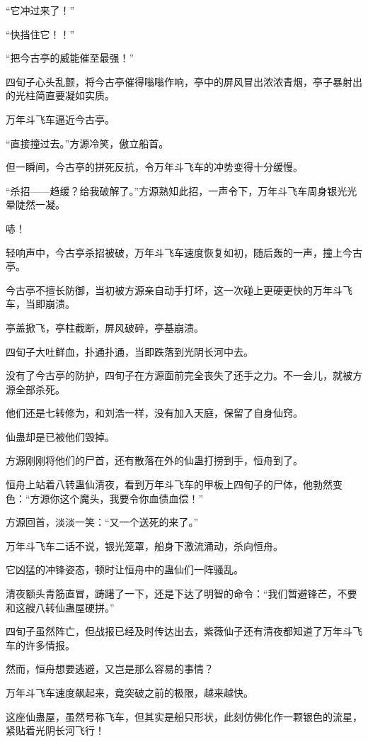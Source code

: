 
\begin{this_body}

“它冲过来了！”

“快挡住它！！”

“把今古亭的威能催至最强！”

四旬子心头乱颤，将今古亭催得嗡嗡作响，亭中的屏风冒出浓浓青烟，亭子暴射出的光柱简直要凝如实质。

万年斗飞车逼近今古亭。

“直接撞过去。”方源冷笑，傲立船首。

但一瞬间，今古亭的拼死反抗，令万年斗飞车的冲势变得十分缓慢。

“杀招——趋缓？给我破解了。”方源熟知此招，一声令下，万年斗飞车周身银光光晕陡然一凝。

哧！

轻响声中，今古亭杀招被破，万年斗飞车速度恢复如初，随后轰的一声，撞上今古亭。

今古亭不擅长防御，当初被方源亲自动手打坏，这一次碰上更硬更快的万年斗飞车，当即崩溃。

亭盖掀飞，亭柱截断，屏风破碎，亭基崩溃。

四旬子大吐鲜血，扑通扑通，当即跌落到光阴长河中去。

没有了今古亭的防护，四旬子在方源面前完全丧失了还手之力。不一会儿，就被方源全部杀死。

他们还是七转修为，和刘浩一样，没有加入天庭，保留了自身仙窍。

仙蛊却是已被他们毁掉。

方源刚刚将他们的尸首，还有散落在外的仙蛊打捞到手，恒舟到了。

恒舟上站着八转蛊仙清夜，看到万年斗飞车的甲板上四旬子的尸体，他勃然变色：“方源你这个魔头，我要令你血债血偿！”

方源回首，淡淡一笑：“又一个送死的来了。”

万年斗飞车二话不说，银光笼罩，船身下激流涌动，杀向恒舟。

它凶猛的冲锋姿态，顿时让恒舟中的蛊仙们一阵骚乱。

清夜额头青筋直冒，踌躇了一下，还是下达了明智的命令：“我们暂避锋芒，不要和这艘八转仙蛊屋硬拼。”

四旬子虽然阵亡，但战报已经及时传达出去，紫薇仙子还有清夜都知道了万年斗飞车的许多情报。

然而，恒舟想要逃避，又岂是那么容易的事情？

万年斗飞车速度飙起来，竟突破之前的极限，越来越快。

这座仙蛊屋，虽然号称飞车，但其实是船只形状，此刻仿佛化作一颗银色的流星，紧贴着光阴长河飞行！


\end{this_body}
